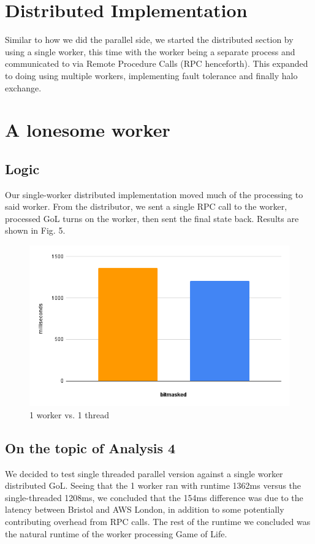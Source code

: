 \documentclass[twoside,twocolumn]{article}
\begin{document}
\section{Distributed Implementation}
Similar to how we did the parallel side, we started the distributed section by using a single worker, this time
with the worker being a separate process and communicated to via Remote Procedure Calls (RPC henceforth). This expanded to
doing using multiple workers, implementing fault tolerance and finally halo exchange.

\section{A lonesome worker}
\subsection{Logic}
Our single-worker distributed implementation moved much of the processing to said worker. From the distributor, we sent a 
single RPC call to the worker, processed GoL turns on the worker, then sent the final state back. Results are shown in Fig. 5.
\begin{figure}
  \includegraphics[width=\linewidth]{1v1.png}
  \caption{1 worker vs. 1 thread}
  \label{fig:chart5}
\end{figure}
\subsection{On the topic of Analysis 4}
We decided to test single threaded parallel version against a single worker distributed GoL. Seeing that the 1 worker ran with
runtime 1362ms versus the single-threaded 1208ms, we concluded that the 154ms difference was due to the latency between Bristol
and AWS London, in addition to some potentially contributing overhead from RPC calls. The rest of the runtime we concluded was the natural
runtime of the worker processing Game of Life. 
\end{document}
